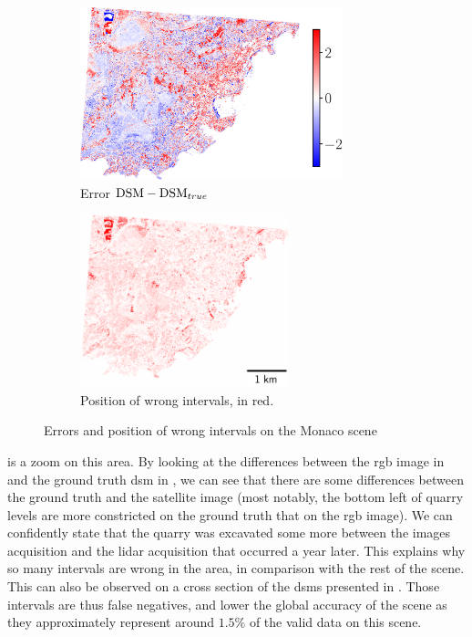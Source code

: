 \begin{figure}
    \begin{subfigure}[t]{0.495\linewidth}
        \flushleft
        \includegraphics[height=5cm]{Images/Chap_6/Monaco_errors.png}
        \caption{Error $\mathrm{DSM}-\mathrm{DSM}_{true}$}
        \label{fig:Monaco_errors}
    \end{subfigure}
    \begin{subfigure}[t]{0.495\linewidth}
        \flushright
        \includegraphics[height=5cm]{Images/Chap_6/Monaco_wrong_intervals.png}
        \caption{Position of wrong intervals, in red.}
        \label{fig:Monaco_wrong_intervals}
    \end{subfigure}
    \caption{Errors and position of wrong intervals on the Monaco scene}
    \label{fig:Monaco_errors_global}
\end{figure}

 is a zoom on this area. By looking at the differences between the \acrshort{rgb} image in  and the ground truth \acrshort{dsm} in , we can see that there are some differences between the ground truth and the satellite image (most notably, the bottom left of quarry levels are more constricted on the ground truth that on the \acrshort{rgb} image). We can confidently state that the quarry was excavated some more between the images acquisition and the \acrshort{lidar} acquisition that occurred a year later. This explains why so many intervals are wrong in the area, in comparison with the rest of the scene. This can also be observed on a cross section of the \acrshort{dsm}s presented in . Those intervals are thus false negatives, and lower the global accuracy of the scene as they approximately represent around $1.5\%$ of the valid data on this scene.

